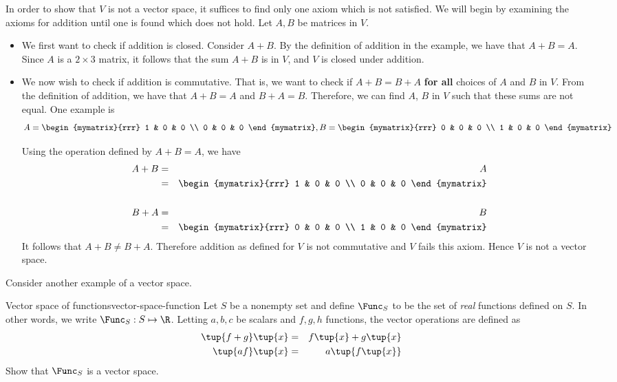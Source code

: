 \begin{solution}
In order to show that $V$ is not a vector space, it suffices to find only one axiom which is not satisfied. We will begin by examining the axioms for addition until one is found which does not hold. Let $A,B$ be matrices in $V$. 

\begin{itemize}
\item
We first want to check if addition is closed. Consider $A+B$. By the definition of addition in the example, we have that $A+B = A$. Since $A$ is a $2 \times 3$ matrix, it follows that the sum $A+B$ is in $V$, and $V$ is closed under addition. 

\item
We now wish to check if addition is commutative. That is, we want to check if $A + B = B + A$ \textbf{for all} choices of $A$ and $B$ in $V$. From the definition of addition, we have that $A + B = A$ and $B + A = B$. Therefore, we can find $A$, $B$ in $V$ such that these sums are not equal. One example is 
\[
A = \begin{mymatrix}{rrr}
1 & 0 & 0 \\
0 & 0 & 0 
\end{mymatrix}, B = \begin{mymatrix}{rrr}
0 & 0 & 0 \\
1 & 0 & 0 
\end{mymatrix}
\]

Using the operation defined by $A+B=A$, we have 
\begin{eqnarray*}
A+B &=& A \\
&=& \begin{mymatrix}{rrr}
1 & 0 & 0 \\
0 & 0 & 0 
\end{mymatrix} \\
\\
B+A &=& B \\
&=& \begin{mymatrix}{rrr}
0 & 0 & 0 \\
1 & 0 & 0 
\end{mymatrix}
\end{eqnarray*}
It follows that $A+B \neq B+A$. Therefore addition as defined for $V$ is not commutative and $V$ fails this axiom. Hence $V$ is not a vector space.
\end{itemize}
\end{solution}

Consider another example of a vector space. 

\begin{example}{Vector space of functions}{vector-space-function}
Let $S$ be a nonempty set and define $\Func_S$ to be the set of \textit{real} functions
defined on $S$. In other words, we write $\Func_S: S \mapsto \R$. Letting $a,b,c$ be scalars and $f,g,h$ functions, the
vector operations are defined as
\begin{eqnarray*}
\tup{f+g} \tup{x}  &=&f\tup{x} +g\tup{
x}  \\
\tup{af} \tup{x}  &=&a\tup{f\tup{x} }
\end{eqnarray*}
Show that $\Func_S$ is a vector space. 
\end{example}

